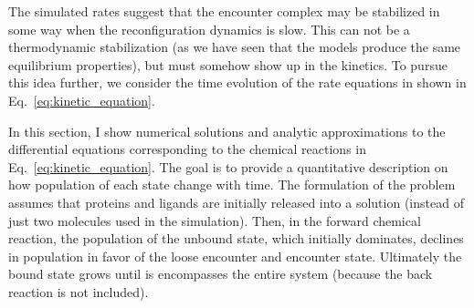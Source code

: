 \documentclass[../talant.diss.submit.tex]{subfiles}
\begin{document}
The simulated rates suggest that the encounter complex may be stabilized in some way  when
the reconfiguration dynamics is slow. This can not be a thermodynamic stabilization (as we have seen
that the models produce the same equilibrium properties), but must somehow show up in the
kinetics. To pursue this idea further, we consider the time evolution of the rate equations
in shown in Eq.~\ref{eq:kinetic_equation}.


In this section, I show numerical solutions and 
analytic approximations  to the differential equations corresponding
to the chemical reactions in Eq.~\ref{eq:kinetic_equation}. The goal is to
provide a quantitative description on how population of each state change with time.
The formulation of the problem assumes that 
proteins and ligands are initially released into a solution (instead of just two molecules
used in the simulation). Then, in the forward chemical reaction, the population of the unbound state, which initially dominates,
declines in population in favor of the loose encounter and encounter state. Ultimately
 the bound state grows until is encompasses the entire system (because the back reaction is not included).
\end{document}

